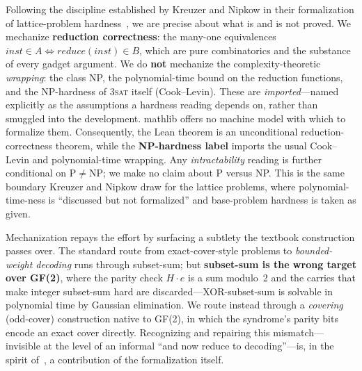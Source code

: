 \documentclass[a4paper,UKenglish,cleveref,autoref]{lipics-v2021}
\begin{document}
Following the discipline established by Kreuzer and Nipkow in their formalization of lattice-problem
hardness~\cite{KN23}, we are precise about what is and is not proved. We mechanize \textbf{reduction
correctness}: the many-one equivalences $\mathit{inst} \in A \iff \mathit{reduce}(\mathit{inst}) \in B$, which
are pure combinatorics and the substance of every gadget argument. We do \textbf{not} mechanize the
complexity-theoretic \emph{wrapping}: the class NP, the polynomial-time bound on the reduction functions, and
the NP-hardness of \textsc{3sat} itself (Cook--Levin). These are \emph{imported}---named explicitly as the
assumptions a hardness reading depends on, rather than smuggled into the development. mathlib offers no machine
model with which to formalize them. Consequently, the Lean theorem is an unconditional reduction-correctness
theorem, while the \textbf{NP-hardness label} imports the usual Cook--Levin and polynomial-time wrapping. Any
\emph{intractability} reading is further conditional on $\mathrm P \neq \mathrm{NP}$; we make no claim about P
versus NP. This is the same boundary Kreuzer and Nipkow draw for the lattice problems, where
polynomial-time-ness is ``discussed but not formalized'' and base-problem hardness is taken as given.

Mechanization repays the effort by surfacing a subtlety the textbook construction passes over. The standard
route from exact-cover-style problems to \emph{bounded-weight decoding} runs through subset-sum; but
\textbf{subset-sum is the wrong target over GF(2)}, where the parity check $H \cdot e$ is a sum modulo~2 and the
carries that make integer subset-sum hard are discarded---XOR-subset-sum is solvable in polynomial time by
Gaussian elimination. We route instead through a \emph{covering} (odd-cover) construction native to GF(2), in
which the syndrome's parity bits encode an exact cover directly. Recognizing and repairing this mismatch---
invisible at the level of an informal ``and now reduce to decoding''---is, in the spirit of~\cite{KN23}, a
contribution of the formalization itself.
\end{document}
